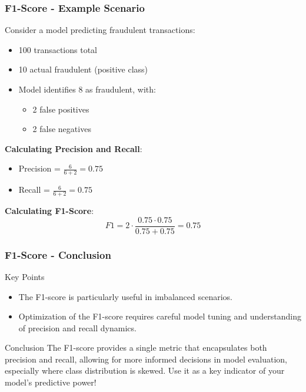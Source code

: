 \documentclass[aspectratio=169]{beamer}
\begin{document}
\begin{frame}[fragile]
    \frametitle{F1-Score - Example Scenario}

    Consider a model predicting fraudulent transactions:
    \begin{itemize}
        \item 100 transactions total
        \item 10 actual fraudulent (positive class)
        \item Model identifies 8 as fraudulent, with:
        \begin{itemize}
            \item 2 false positives
            \item 2 false negatives
        \end{itemize}
    \end{itemize}
    
    \textbf{Calculating Precision and Recall}:
    \begin{itemize}
        \item Precision = $\frac{6}{6 + 2} = 0.75$
        \item Recall = $\frac{6}{6 + 2} = 0.75$
    \end{itemize}

    \textbf{Calculating F1-Score}:
    \begin{equation}
        F1 = 2 \cdot \frac{0.75 \cdot 0.75}{0.75 + 0.75} = 0.75
    \end{equation}
\end{frame}

\begin{frame}[fragile]
    \frametitle{F1-Score - Conclusion}

    \begin{block}{Key Points}
        \begin{itemize}
            \item The F1-score is particularly useful in imbalanced scenarios.
            \item Optimization of the F1-score requires careful model tuning and understanding of precision and recall dynamics.
        \end{itemize}
    \end{block}

    \begin{block}{Conclusion}
        The F1-score provides a single metric that encapsulates both precision and recall, allowing for more informed decisions in model evaluation, especially where class distribution is skewed. Use it as a key indicator of your model's predictive power!
    \end{block}
\end{frame}
\end{document}
